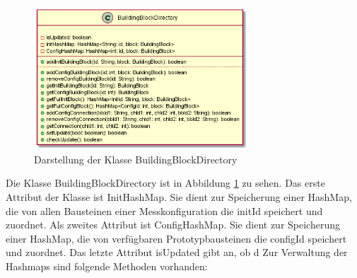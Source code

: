 \documentclass[parskip=full]{scrartcl}
\begin{document}
\begin{figure}[htbp]
	\begin{center}
		\includegraphics[width = 8cm]{Grafiken/BuildingBlockDirectory.PNG}
		\caption{Darstellung der Klasse BuildingBlockDirectory}
		\label{BuildingBlockDirectory}
	\end{center}
\end{figure}
Die Klasse BuildingBlockDirectory ist in Abbildung \ref{BuildingBlockDirectory} zu sehen.
Das erste Attribut der Klasse ist InitHashMap. Sie dient zur Speicherung einer HashMap, die von allen Bausteinen einer Messkonfiguration die initId speichert und zuordnet. Als zweites Attribut ist ConfigHashMap. Sie dient zur Speicherung einer HashMap, die von verfügbaren Prototypbausteinen die configId speichert und zuordnet. Das letzte Attribut isUpdated gibt an, ob d
Zur Verwaltung der Hashmaps sind folgende Methoden vorhanden:
\end{document}
